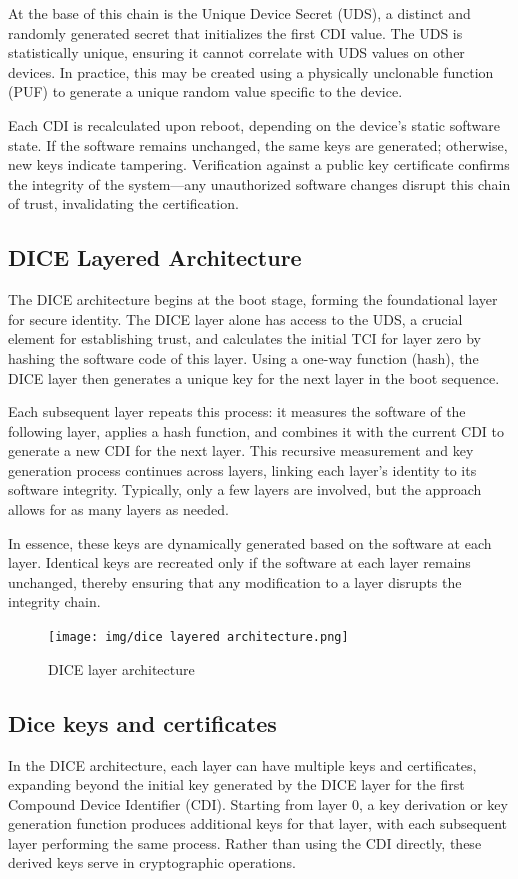 At the base of this chain is the Unique Device Secret (UDS), a
distinct and randomly generated secret that initializes the first CDI
value. The UDS is statistically unique, ensuring it cannot correlate
with UDS values on other devices. In practice, this may be created
using a physically unclonable function (PUF) to generate a unique
random value specific to the device.

Each CDI is recalculated upon reboot, depending on the device’s static
software state. If the software remains unchanged, the same keys are
generated; otherwise, new keys indicate tampering. Verification
against a public key certificate confirms the integrity of the
system—any unauthorized software changes disrupt this chain of trust,
invalidating the certification.

\subsection{DICE Layered Architecture}

The DICE architecture begins at the boot stage, forming the
foundational layer for secure identity. The DICE layer alone has
access to the UDS, a crucial element for establishing trust, and
calculates the initial TCI for layer zero by hashing the software code
of this layer. Using a one-way function (hash), the DICE layer then
generates a unique key for the next layer in the boot sequence.

Each subsequent layer repeats this process: it measures the software
of the following layer, applies a hash function, and combines it with
the current CDI to generate a new CDI for the next layer. This
recursive measurement and key generation process continues across
layers, linking each layer’s identity to its software integrity.
Typically, only a few layers are involved, but the approach allows for
as many layers as needed.

In essence, these keys are dynamically generated based on the software
at each layer. Identical keys are recreated only if the software at
each layer remains unchanged, thereby ensuring that any modification
to a layer disrupts the integrity chain.

\begin{figure}[H]
  \centering
  \texttt{[image: img/dice layered
  architecture.png]}
  \caption{DICE layer architecture}
\end{figure}

\subsection{Dice keys and certificates}
In the DICE architecture, each layer can have multiple keys and
certificates, expanding beyond the initial key generated by the DICE
layer for the first Compound Device Identifier (CDI). Starting from
layer 0, a key derivation or key generation function produces
additional keys for that layer, with each subsequent layer performing
the same process. Rather than using the CDI directly, these derived
keys serve in cryptographic operations.

